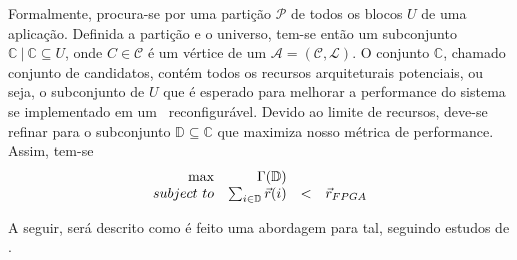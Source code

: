      Formalmente, procura-se por uma partição $ \mathcal{P} $ de todos os blocos $ U $ de uma aplicação.
      Definida a partição e o universo, tem-se então um subconjunto $ \mathbb{C}\ |\ \mathbb{C} \subseteq U $, onde $ C \in \mathcal{C} $ é um vértice de um $ \mathcal{A} = (\mathcal{C}, \mathcal{L}) $.
      O conjunto $ \mathbb{C} $, chamado conjunto de candidatos, contém todos os recursos arquiteturais potenciais, ou seja, o subconjunto de $ U $ que é esperado para melhorar a performance do sistema se implementado em um \hardware\ reconfigurável.
      Devido ao limite de recursos, deve-se refinar para o subconjunto $ \mathbb{D} \subseteq \mathbb{C} $ que maximiza nosso métrica de performance.
      Assim, tem-se
      \begin{equation}
         \begin{array}{rrcl}
         \textnormal{max}                 & \Gamma ( \mathbb{D})               & ~   & ~                \\
         subject\ to & \sum_{i \in \mathbb{D}} \vec{r}(i) & < & \vec{r}_{FPGA}
         \end{array}
         \label{eq:constraints}
      \end{equation}

      A seguir, será descrito como é feito uma abordagem para tal, seguindo estudos de \cite{Arato2003, Wang2016}.


